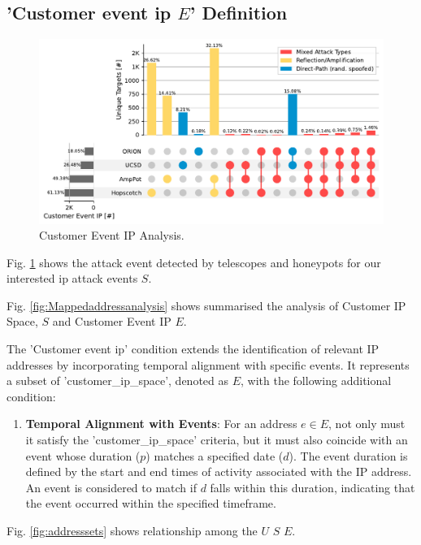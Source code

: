 \subsection*{'Customer event ip $E$' Definition}
\begin{figure}[htbp]
    \centering
    \includegraphics[scale=0.4]{graphs/space_event.pdf}
    \caption{Customer Event IP Analysis.}
    \label{fig:customereventip}
\end{figure}
Fig. \ref{fig:customereventip} shows the attack event detected by telescopes and honeypots for our interested ip attack events $S$.


Fig. \ref{fig:Mappedaddressanalysis} shows summarised the analysis of Customer IP Space, $S$ and Customer Event IP $E$.


The 'Customer event ip' condition extends the identification of relevant IP addresses by incorporating temporal alignment with specific events. It represents a subset of 'customer\_ip\_space', denoted as $E$, with the following additional condition:

\begin{enumerate}
    \item \textbf{Temporal Alignment with Events}: For an address $e \in E$, not only must it satisfy the 'customer\_ip\_space' criteria, but it must also coincide with an event whose duration ($p$) matches a specified date ($d$). The event duration is defined by the start and end times of activity associated with the IP address. An event is considered to match if $d$ falls within this duration, indicating that the event occurred within the specified timeframe.
\end{enumerate}
Fig. \ref{fig:addresssets} shows relationship among the $U$ $S$ $E$.

